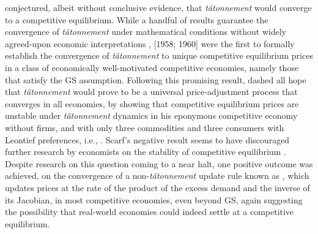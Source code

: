 \citet{walras}
conjectured, albeit without conclusive evidence, that \emph{t\^atonnement\/} would converge to a competitive equilibrium.
While a handful of results guarantee the convergence of \emph{t\^atonnement\/} under mathematical conditions without widely agreed-upon economic interpretations \cite{nikaido1960stability, uzawa1960walras}, \citeauthor{arrow-hurwicz} [1958; 1960]
were the first to formally establish the convergence of \emph{t\^atonnement} to unique competitive equilibrium prices in a class of economically well-motivated competitive economies, namely those that satisfy the GS assumption.
Following this promising result, \citet{scarf1960instable} dashed all hope that \emph{t\^atonnement\/} would prove to be a universal price-adjustment process that converges in all economies, by showing that competitive equilibrium prices are unstable under \emph{t\^atonnement\/} dynamics in his eponymous competitive economy without firms, and with only three commodities and three consumers with Leontief preferences, i.e., .
Scarf's negative result seems to have discouraged further research by economists on the stability of competitive equilibrium \cite{fisher1975stability}.
Despite research on this question coming to a near halt, one positive outcome was achieved, on the convergence of a non-\emph{t\^atonnement\/} update rule known as  \cite{herings1997globally, kamiya1990globally, van1987convergent, smale1976convergent}, which updates prices at the rate of the product of the excess demand and the inverse of its Jacobian, in most competitive economies, even beyond GS, again suggesting the possibility that real-world economies could indeed settle at a competitive equilibrium. 

